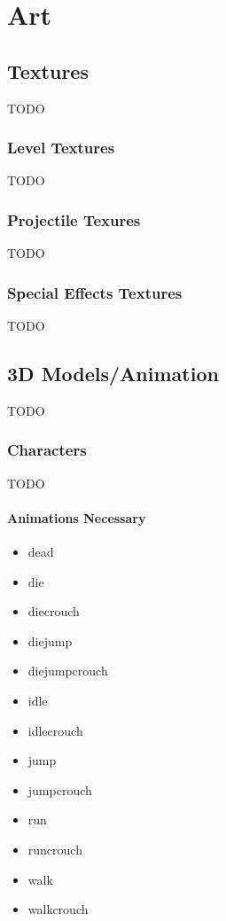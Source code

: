 \chapter{Art}

\section{Textures}

TODO

\subsection{Level Textures}

TODO

\subsection{Projectile Texures}

TODO

\subsection{Special Effects Textures}

TODO

\section{3D Models/Animation}

TODO

\subsection{Characters}

TODO

\subsubsection{Animations Necessary}

\begin{itemize}

\item dead
\item die
\item diecrouch
\item diejump
\item diejumpcrouch
\item idle
\item idlecrouch
\item jump
\item jumpcrouch
\item run
\item runcrouch
\item walk
\item walkcrouch

\end{itemize}

